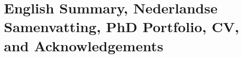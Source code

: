 \backmatter
\chapter[English Summary, Nederlandse Samenvatting, PhD Portfolio, CV, and Acknowledgements][]{English Summary, Nederlandse Samenvatting, PhD Portfolio, CV, and Acknowledgements}
\cleardoublepage


\clearpage

\clearpage

\clearpage

\clearpage


